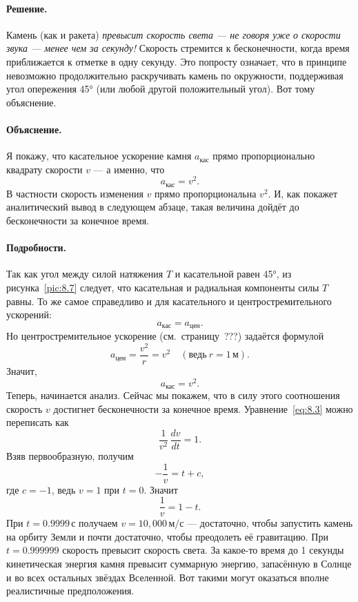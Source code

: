 \paragraph{Решение.}
Камень (как и ракета) \emph{превысит скорость света --- не говоря уже о скорости звука --- менее чем за секунду!}
Скорость стремится к бесконечности, когда время приближается к отметке в одну секунду.
Это попросту означает, что в принципе невозможно продолжительно раскручивать камень по окружности, поддерживая угол опережения 45° (или любой другой положительный угол).
Вот тому объяснение.

\paragraph{Объяснение.}
Я покажу, что касательное ускорение камня $a_{\text{кас}}$ прямо пропорционально квадрату скорости $v$ ---
а именно, что
\[
a_{\text{кас}} = v^{2}.
\]
В частности скорость изменения $v$ прямо пропорциональна $v^2$.
И, как покажет аналитический вывод в следующем абзаце, такая величина дойдёт до бесконечности за конечное время.

\paragraph{Подробности.}
Так как угол между силой натяжения $T$ и касательной равен 45°,
из рисунка~\ref{pic:8.7} следует, что касательная и радиальная компоненты силы $T$ равны.
То же самое справедливо и для касательного и центростремительного ускорений:
\[
a_{\text{кас}} = a_{\text{цен}}.
\]
Но центростремительное ускорение (см.~страницу~???) задаётся формулой
\[
a_{\text{цен}} = \frac{v^2}{r} = v^2 \quad (\text{ведь}\  r = 1\,\text{м}).
\]
Значит,
\begin{equation}
a_{\text{кас}} = v^2. \label{eq:8.3}
\end{equation}
Теперь, начинается анализ.
Сейчас мы покажем, что в силу этого соотношения
скорость $v$ достигнет бесконечности за конечное время.
Уравнение~\eqref{eq:8.3} можно переписать как
\begin{equation}
\frac{1}{v^2}\,\frac{dv}{dt} = 1. \label{eq:8.4}
\end{equation}
Взяв первообразную, получим
\[
-\frac{1}{v} = t + c,
\]
где $c = -1$, ведь $v = 1$ при $t = 0$.
Значит
\[
\frac{1}{v} = 1 - t.
\]
При $t = 0.9999 \,\text{с}$ получаем $v = 10{,}000 \,\text{м/с}$ ---
достаточно, чтобы запустить камень на орбиту Земли и почти достаточно,
чтобы преодолеть её гравитацию.
При $t = 0.999999$ скорость превысит скорость света.
За какое-то время до 1 секунды кинетическая энергия камня
превысит суммарную энергию, запасённую в Солнце и во всех остальных
звёздах Вселенной.
Вот такими могут оказаться вполне реалистичные предположения.

